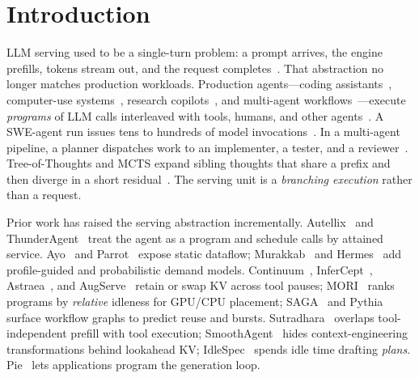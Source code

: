 \section{Introduction}
\label{sec:intro}

LLM serving used to be a single-turn problem: a prompt arrives, the engine prefills, tokens stream out, and the request completes~\cite{orca,vllm,sglang}.
That abstraction no longer matches production workloads.
Production agents---coding assistants~\cite{sweagent,openhands,claude_code}, computer-use systems~\cite{webarena}, research copilots~\cite{gaia}, and multi-agent workflows~\cite{autogen,metagpt}---execute \emph{programs} of LLM calls interleaved with tools, humans, and other agents~\cite{react,compoundai}.
A SWE-agent run issues tens to hundreds of model invocations~\cite{swebench,continuum}.
In a multi-agent pipeline, a planner dispatches work to an implementer, a tester, and a reviewer~\cite{metagpt,pythia}.
Tree-of-Thoughts and MCTS expand sibling thoughts that share a prefix and then diverge in a short residual~\cite{tot,autellix,hive}.
The serving unit is a \emph{branching execution} rather than a request.

Prior work has raised the serving abstraction incrementally.
Autellix~\cite{autellix} and ThunderAgent~\cite{thunderagent} treat the agent as a program and schedule calls by attained service.
Ayo~\cite{ayo} and Parrot~\cite{parrot} expose static dataflow; Murakkab~\cite{murakkab} and Hermes~\cite{hermes} add profile-guided and probabilistic demand models.
Continuum~\cite{continuum}, InferCept~\cite{infercept}, Astraea~\cite{astraea}, and AugServe~\cite{augserve} retain or swap KV across tool pauses; MORI~\cite{mori} ranks programs by \emph{relative} idleness for GPU/CPU placement; SAGA~\cite{saga} and Pythia~\cite{pythia} surface workflow graphs to predict reuse and bursts.
Sutradhara~\cite{sutradhara} overlaps tool-independent prefill with tool execution; SmoothAgent~\cite{smoothagent} hides context-engineering transformations behind lookahead KV; IdleSpec~\cite{idlespec} spends idle time drafting \emph{plans}.
Pie~\cite{pie} lets applications program the generation loop.

